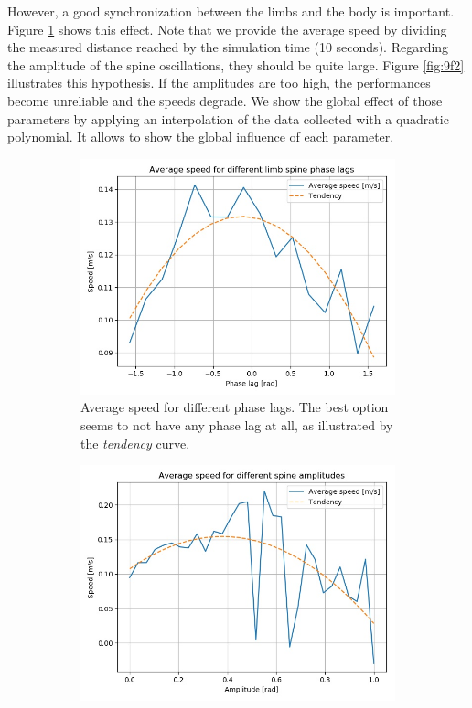 \documentclass{cmc}
\begin{document}
However, a good synchronization between the limbs and the body is important. Figure \ref{fig:9f1} shows this effect. Note that we provide the average speed by dividing the measured distance reached by the simulation time (10 seconds). Regarding the amplitude of the spine oscillations, they should be quite large. Figure \ref{fig:9f2} illustrates this hypothesis. If the amplitudes are too high, the performances become unreliable and the speeds degrade. We show the global effect of those parameters by applying an interpolation of the data collected with a quadratic polynomial. It allows to show the global influence of each parameter. 

\begin{figure}[!ht]
  \begin{subfigure}[b]{0.48\textwidth}
    \includegraphics[width=\textwidth]{figures/9f/9f1_speed.jpg}
    \caption{Average speed for different phase lags. The best option seems to not have any phase lag at all, as illustrated by the \textit{tendency} curve. }
    \label{fig:9f1}
  \end{subfigure}
  \begin{subfigure}[b]{0.48\textwidth}
    \includegraphics[width=\textwidth]{figures/9f/9f2_speed.jpg}

\end{subfigure}
\end{figure}
\end{document}

